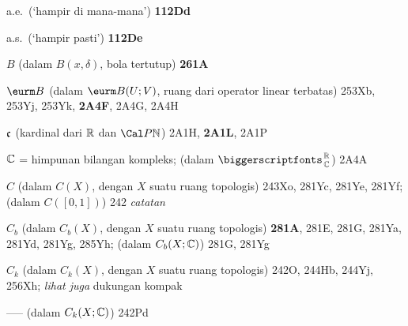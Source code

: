 a.e.\ (`hampir di mana-mana') {\bf 112Dd}

a.s.\ (`hampir pasti') {\bf 112De}



\indexmedskip
{}



$B$ (dalam $B(x,\delta)$, bola tertutup) {\bf 261A}


$\eurm B$ (dalam $\eurm B(U;V)$, ruang dari operator linear terbatas)
253Xb, 253Yj, 253Yk, {\bf 2A4F}, 2A4G, 2A4H 

















\indexmedskip
{}







$\frak c$ (kardinal dari $\Bbb R$ dan $\Cal P\Bbb N$) 2A1H,
{\bf 2A1L}, 2A1P




$\Bbb C$ = himpunan bilangan kompleks; (dalam $\RoverC$) 2A4A

$C$ (dalam $C(X)$, dengan $X$ suatu ruang topologis) 243Xo, 281Yc,
281Ye, 281Yf;  
  (dalam $C([0,1])$) 242 {\it catatan}




$C_b$ (dalam $C_b(X)$, dengan $X$ suatu ruang topologis) {\bf 281A},
281E, 281G, 281Ya, 281Yd, 281Yg, 285Yh;  
  (dalam $C_b(X;\Bbb C)$) 281G, 281Yg




$C_k$ (dalam $C_k(X)$, dengan $X$ suatu ruang topologis)
242O, 244Hb, 244Yj, 256Xh;  
  {\it lihat juga} dukungan kompak


----- (dalam $C_k(X;\Bbb C)$) 242Pd

































